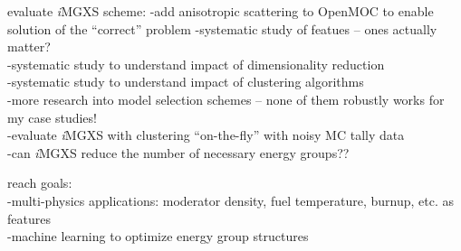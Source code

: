 \documentclass[12pt,twoside]{mitthesis-exec}
\begin{document}
evaluate \textit{i}MGXS scheme:
-add anisotropic scattering to OpenMOC to enable solution of the ``correct'' problem
-systematic study of featues -- ones actually matter? \\
-systematic study to understand impact of dimensionality reduction \\
-systematic study to understand impact of clustering algorithms \\
-more research into model selection schemes -- none of them robustly works for my case studies! \\
-evaluate \textit{i}MGXS with clustering ``on-the-fly'' with noisy MC tally data \\
-can \textit{i}MGXS reduce the number of necessary energy groups?? \\

\break

reach goals:\\
-multi-physics applications: moderator density, fuel temperature, burnup, etc. as features \\
-machine learning to optimize energy group structures \\



\begin{singlespace}


\end{singlespace}
\end{document}
